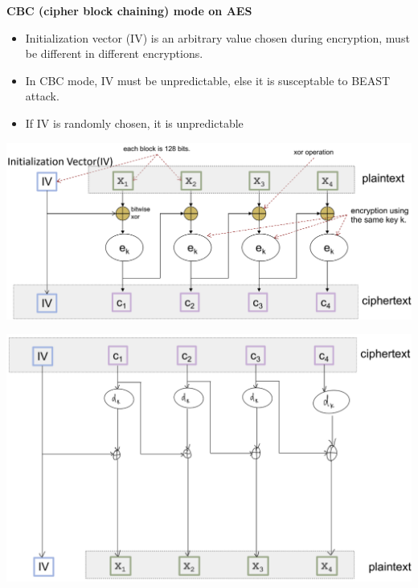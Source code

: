 \documentclass[landscape,a4paper]{extarticle}
\newenvironment{Figure}
  {\par\noindent\minipage{\linewidth}}
  {\endminipage\par\medskip}
\begin{document}
\begin{multicols*}{5}
    \textbf{CBC (cipher block chaining) mode on AES}
    \begin{itemize}
        \item Initialization vector (IV) is an arbitrary value chosen during encryption, 
        must be different in different encryptions. 
        \item In CBC mode, IV must be unpredictable, else it is susceptable to BEAST attack.
        \item If IV is randomly chosen, it is unpredictable
    \end{itemize}
    \begin{Figure}
        \centering
        \includegraphics[width=\linewidth]{cbc_encryption.png}        
    \end{Figure}
    \begin{Figure}
        \centering
        \includegraphics[width=\linewidth]{cbc_decryption.png}        
    \end{Figure}


\end{multicols*}
\end{document}

